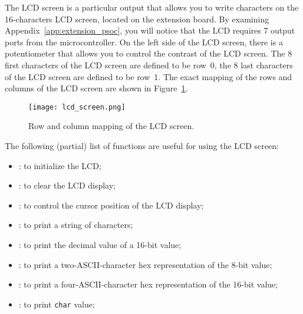 The LCD screen is a particular output that allows you to write characters on the 16-characters LCD screen, located on the extension board. By examining Appendix~\ref{app:extension_psoc}, you will notice that the LCD requires 7 output ports from the microcontroller. On the left side of the LCD screen, there is a potentiometer that allows you to control the contrast of the LCD screen. The 8 first characters of the LCD screen are defined to be row~0, the 8 last characters of the LCD screen are defined to be row~1. The exact mapping of the rows and columns of the LCD screen are shown in Figure~\ref{fig:lcd_screen}. 
\begin{figure}[h]
	\centering
	\texttt{[image: lcd\_screen.png]}
	\caption{Row and column mapping of the LCD screen. }
	\label{fig:lcd_screen}
\end{figure}
The following (partial) list of functions are useful for using the LCD screen: 
\begin{itemize}
		\item {}: to initialize the LCD; 
		\item {}: to clear the LCD display; 
		\item {}: to control the cursor position of the LCD display; 
		\item {}: to print a string of characters; 
		\item {}: to print the decimal value of a 16-bit value; 
		\item {}: to print a two-ASCII-character hex representation of the 8-bit value; 
		\item {}: to print a four-ASCII-character hex representation of the 16-bit value; 
		\item {}: to print \texttt{char} value; 
\end{itemize}

